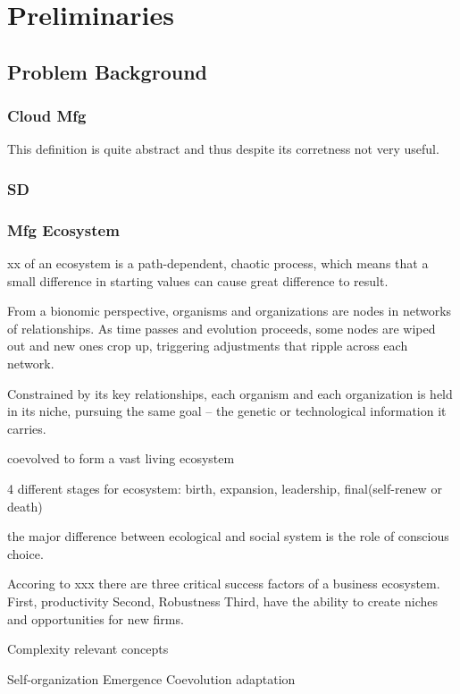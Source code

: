 \section{Preliminaries} %

\subsection{Problem Background} %
\label{sub:problem_background}

\subsubsection{Cloud Mfg}
This definition is quite abstract and thus despite its corretness not very useful.

\subsubsection{SD}

\subsubsection{Mfg Ecosystem}
xx of an ecosystem is a path-dependent, chaotic process, which means that a small difference in starting values can cause great difference to result.

From a bionomic perspective, organisms and organizations are nodes in networks of relationships. As time passes and evolution proceeds, some nodes are wiped out and new ones crop up, triggering adjustments that ripple across each network. 

Constrained by its key relationships, each organism and each organization is held in its niche, pursuing the same goal -- the genetic or technological information it carries.

coevolved to form a vast living ecosystem

4 different stages for ecosystem:
birth, expansion, leadership, final(self-renew or death)

the major difference between ecological and social system is the role of conscious choice.

Accoring to xxx there are three critical success factors of a business ecosystem.
First, productivity
Second, Robustness
Third, have the ability to create niches and opportunities for new firms.

Complexity relevant concepts

Self-organization
Emergence
Coevolution
adaptation

